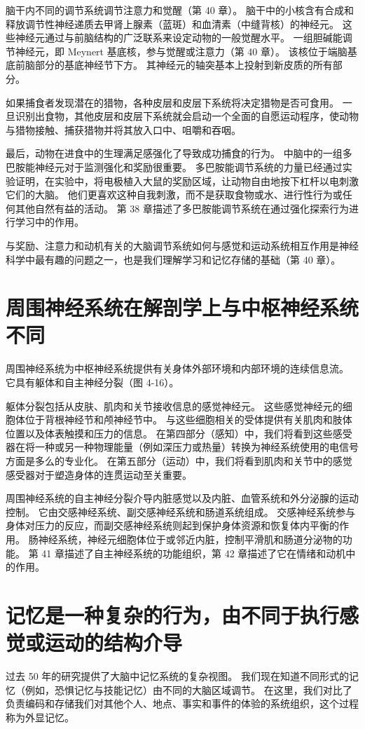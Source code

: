 脑干内不同的调节系统调节注意力和觉醒（第 40 章）。 脑干中的小核含有合成和释放调节性神经递质去甲肾上腺素（蓝斑）和血清素（中缝背核）的神经元。 这些神经元通过与前脑结构的广泛联系来设定动物的一般觉醒水平。 一组胆碱能调节神经元，即 Meynert 基底核，参与觉醒或注意力（第 40 章）。 该核位于端脑基底前脑部分的基底神经节下方。 其神经元的轴突基本上投射到新皮质的所有部分。

如果捕食者发现潜在的猎物，各种皮层和皮层下系统将决定猎物是否可食用。 一旦识别出食物，其他皮层和皮层下系统就会启动一个全面的自愿运动程序，使动物与猎物接触、捕获猎物并将其放入口中、咀嚼和吞咽。

最后，动物在进食中的生理满足感强化了导致成功捕食的行为。 中脑中的一组多巴胺能神经元对于监测强化和奖励很重要。 多巴胺能调节系统的力量已经通过实验证明，在实验中，将电极植入大鼠的奖励区域，让动物自由地按下杠杆以电刺激它们的大脑。 他们更喜欢这种自我刺激，而不是获取食物或水、进行性行为或任何其他自然有益的活动。 第 38 章描述了多巴胺能调节系统在通过强化探索行为进行学习中的作用。

与奖励、注意力和动机有关的大脑调节系统如何与感觉和运动系统相互作用是神经科学中最有趣的问题之一，也是我们理解学习和记忆存储的基础（第 40 章）。


\section{周围神经系统在解剖学上与中枢神经系统不同}
周围神经系统为中枢神经系统提供有关身体外部环境和内部环境的连续信息流。 它具有躯体和自主神经分裂（图 4-16）。


躯体分裂包括从皮肤、肌肉和关节接收信息的感觉神经元。 这些感觉神经元的细胞体位于背根神经节和颅神经节中。 与这些细胞相关的受体提供有关肌肉和肢体位置以及体表触摸和压力的信息。 在第四部分（感知）中，我们将看到这些感受器在将一种或另一种物理能量（例如深压力或热量）转换为神经系统使用的电信号方面是多么的专业化。 在第五部分（运动）中，我们将看到肌肉和关节中的感觉感受器对于塑造身体的连贯运动至关重要。

周围神经系统的自主神经分裂介导内脏感觉以及内脏、血管系统和外分泌腺的运动控制。 它由交感神经系统、副交感神经系统和肠道系统组成。 交感神经系统参与身体对压力的反应，而副交感神经系统则起到保护身体资源和恢复体内平衡的作用。 肠神经系统，神经元细胞体位于或邻近内脏，控制平滑肌和肠道分泌物的功能。 第 41 章描述了自主神经系统的功能组织，第 42 章描述了它在情绪和动机中的作用。


\section{记忆是一种复杂的行为，由不同于执行感觉或运动的结构介导}
过去 50 年的研究提供了大脑中记忆系统的复杂视图。 我们现在知道不同形式的记忆（例如，恐惧记忆与技能记忆）由不同的大脑区域调节。 在这里，我们对比了负责编码和存储我们对其他个人、地点、事实和事件的体验的系统组织，这个过程称为外显记忆。

